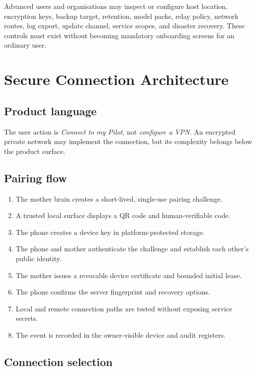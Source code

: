 \documentclass[11pt,a4paper]{article}
\begin{document}
Advanced users and organisations may inspect or configure host location,
encryption keys, backup target, retention, model packs, relay policy, network
routes, log export, update channel, service scopes, and disaster recovery.
These controls must exist without becoming mandatory onboarding screens for an
ordinary user.

\section{Secure Connection Architecture}

\subsection{Product language}

The user action is \emph{Connect to my Pilot}, not \emph{configure a VPN}.
An encrypted private network may implement the connection, but its complexity
belongs below the product surface.

\subsection{Pairing flow}

\begin{enumerate}[leftmargin=*]
  \item The mother brain creates a short-lived, single-use pairing challenge.
  \item A trusted local surface displays a QR code and human-verifiable code.
  \item The phone creates a device key in platform-protected storage.
  \item The phone and mother authenticate the challenge and establish each
        other's public identity.
  \item The mother issues a revocable device certificate and bounded initial lease.
  \item The phone confirms the server fingerprint and recovery options.
  \item Local and remote connection paths are tested without exposing service secrets.
  \item The event is recorded in the owner-visible device and audit registers.
\end{enumerate}

\subsection{Connection selection}
\end{document}
